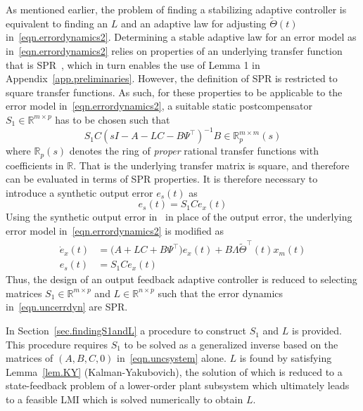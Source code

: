 As mentioned earlier, the problem of finding a stabilizing adaptive controller is equivalent to finding an $L$ and an adaptive law for adjusting $\widetilde{\Theta}(t)$ in\ \eqref{eqn.errordynamics2}.
Determining a stable adaptive law for an error model as in\ \eqref{eqn.errordynamics2} relies on properties of an underlying transfer function that is SPR\ \cite{narendra.stable.2005}, which in turn enables the use of  Lemma 1 in Appendix~\ref{app.preliminaries}.
However, the definition of SPR is restricted to square transfer functions.
As such, for these properties to be applicable to the error model in\ \eqref{eqn.errordynamics2}, a suitable static postcompensator $S_1\in\mathbb{R}^{m\times p}$ has to be chosen such that
\begin{equation*}
  S_{1}C(sI-A-LC-B\Psi^{\top})^{-1}B \in\mathbb{R}_{p}^{m\times m}(s)
\end{equation*}
where $\mathbb{R}_{p}(s)$ denotes the ring of \textit{proper} rational transfer functions with coefficients in $\mathbb{R}$.
That is the underlying transfer matrix is square, and therefore can be evaluated in terms of SPR properties.
It is therefore necessary to introduce a synthetic output error $e_{s}(t)$ as
\begin{equation}
  \label{eqn.syntheticoutputerror}
  e_{s}(t) = S_{1}Ce_{x}(t)
\end{equation}
Using the synthetic output error in\ \label{eqn.syntheticoutputerror} in place of the output error, the underlying error model in\ \eqref{eqn.errordynamics2} is modified as
\begin{equation}
  \label{eqn.uncerrdyn}
  \begin{split}
    \dot{e}_{x}(t) &= \bigr(A+LC+B\Psi^{\top}\bigr)e_{x}(t) + B\Lambda\widetilde{\Theta}^{\top}(t)x_{m}(t) \\
    e_{s}(t) &= S_{1}Ce_{x}(t)
  \end{split}
\end{equation}
Thus, the design of an output feedback adaptive controller is reduced to selecting matrices $S_{1}\in\mathbb{R}^{m\times p}$ and $L\in\mathbb{R}^{n\times p}$ such that the error dynamics in\ \eqref{eqn.uncerrdyn} are SPR.\@

In Section~\ref{sec.findingS1andL} a procedure to construct $S_{1}$ and $L$ is provided.
This procedure requires $S_{1}$ to be solved as a generalized inverse based on the matrices of $(A,B,C,0)$ in\ \eqref{eqn.uncsystem} alone.
$L$ is found by satisfying Lemma~\ref{lem.KY} (Kalman-Yakubovich), the solution of which is reduced to a state-feedback problem of a lower-order plant subsystem which ultimately leads to a feasible LMI which is solved numerically to obtain $L$.

